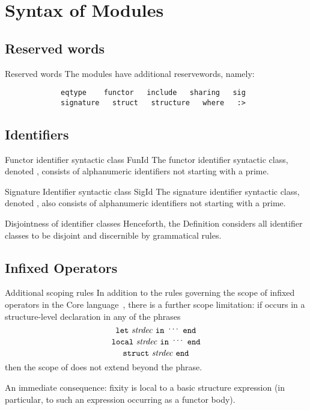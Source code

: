 \chapter{Syntax of Modules}

\section{Reserved words}

\begin{definition}{Reserved words}\label{defn:syntax-modules:reserved-words}
The modules have additional reservewords, namely:
\begin{verbatim}
             eqtype    functor   include   sharing   sig
             signature   struct   structure   where   :>
\end{verbatim}
\end{definition}

\section{Identifiers}

\begin{definition}{Functor identifier syntactic class FunId}
The functor identifier syntactic class, denoted \FunId, consists of
alphanumeric identifiers not starting with a prime.
\end{definition}

\begin{definition}{Signature Identifier syntactic class SigId}
The signature identifier syntactic class, denoted \SigId, also consists
of alphanumeric identifiers not starting with a prime.
\end{definition}

\begin{convention}{Disjointness of identifier classes}
Henceforth, the Definition considers all identifier classes to be
disjoint and discernible by grammatical rules.
\end{convention}

\section{Infixed Operators}

\begin{clause}{Additional scoping rules}
In addition to the rules governing the scope of infixed operators in the
Core language~, there is a
further scope limitation: if  occurs in a
structure-level declaration  in any of the phrases
\[ \texttt{let}\ \nonterminal{strdec}\ \texttt{in}\ \syndots\ \texttt{end} \]
\[ \texttt{local}\ \nonterminal{strdec}\ \texttt{in}\ \syndots\ \texttt{end} \]
\[ \texttt{struct}\ \nonterminal{strdec}\ \texttt{end} \]
then the scope of  does not extend beyond the phrase.

An immediate consequence: fixity is local to a basic structure
expression (in particular, to such an expression occurring as a functor body).
\end{clause}

